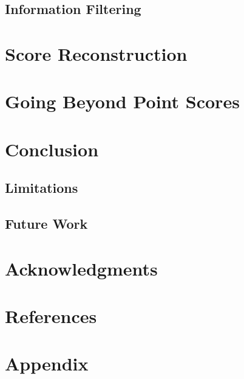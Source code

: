 \documentclass{article}
\begin{document}
%
%
\subsection{Information Filtering}

\section{Score Reconstruction}

\section{Going Beyond Point Scores}
\section{Conclusion}
\subsection{Limitations}
\subsection{Future Work}

\section*{Acknowledgments}
\section*{References}
\section*{Appendix}
\end{document}
